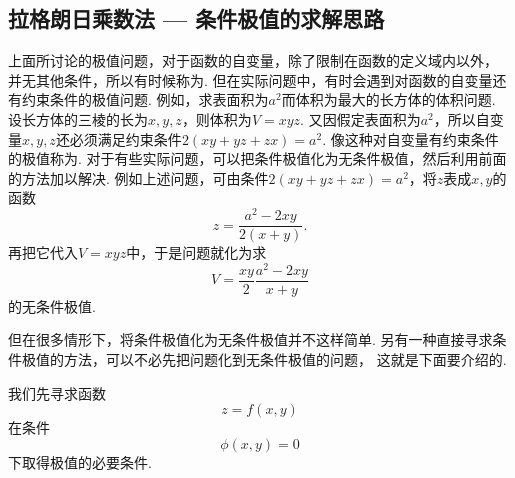 \subsection{拉格朗日乘数法 --- 条件极值的求解思路}\label{section:多元函数微分法.拉格朗日乘数法}
上面所讨论的极值问题，对于函数的自变量，除了限制在函数的定义域内以外，
并无其他条件，所以有时候称为.
但在实际问题中，有时会遇到对函数的自变量还有约束条件的极值问题.
例如，求表面积为\(a^2\)而体积为最大的长方体的体积问题.
设长方体的三棱的长为\(x,y,z\)，则体积为\(V = xyz\).
又因假定表面积为\(a^2\)，所以自变量\(x,y,z\)还必须满足约束条件\(2(xy+yz+zx)=a^2\).
像这种对自变量有约束条件的极值称为.
对于有些实际问题，可以把条件极值化为无条件极值，然后利用前面的方法加以解决.
例如上述问题，可由条件\(2(xy+yz+zx)=a^2\)，将\(z\)表成\(x,y\)的函数\[
	z = \frac{a^2-2xy}{2(x+y)}.
\]
再把它代入\(V = xyz\)中，于是问题就化为求\[
	V = \frac{xy}{2} \frac{a^2-2xy}{x+y}
\]的无条件极值.

但在很多情形下，将条件极值化为无条件极值并不这样简单.
另有一种直接寻求条件极值的方法，可以不必先把问题化到无条件极值的问题，
这就是下面要介绍的.

我们先寻求函数
\begin{equation}\label{equation:拉格朗日乘数法.目标函数1}
	z=f(x,y)
\end{equation}
在条件
\begin{equation}\label{equation:拉格朗日乘数法.限制条件1}
	\phi(x,y)=0
\end{equation}
下取得极值的必要条件.

